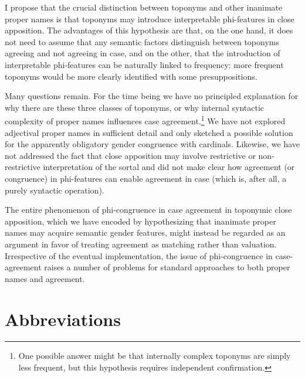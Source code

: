 \documentclass[output=paper,colorlinks,citecolor=brown]{langscibook}
\begin{document}
I propose that the crucial distinction between toponyms and other inanimate proper names is that toponyms may introduce interpretable phi-features in close apposition. The advantages of this hypothesis are that, on the one hand, it does not need to assume that any semantic factors distinguish between toponyms agreeing and not agreeing in case, and on the other, that the introduction of interpretable phi-features can be naturally linked to frequency: more frequent toponyms would be more clearly identified with some presuppositions.

Many questions remain. For the time being we have no principled explanation for why there are these three classes of toponyms, or why internal syntactic complexity of proper names influences case agreement.\footnote{One possible answer might be that internally complex toponyms are simply less frequent, but this hypothesis requires independent confirmation.} We have not explored adjectival proper names in sufficient detail and only sketched a possible solution for the apparently obligatory gender congruence with cardinals. Likewise, we have not addressed the fact that close apposition may involve restrictive or non-restrictive interpretation of the sortal and did not make clear how agreement (or congruence) in phi-features can enable agreement in case (which is, after all, a purely syntactic operation).

The entire phenomenon of phi-congruence in case agreement in toponymic close apposition, which we have encoded by hypothesizing that inanimate proper names may acquire semantic gender features, might instead be regarded as an argument in favor of treating agreement as matching rather than valuation. Irrespective of the eventual implementation, the issue of phi-congruence in case-agreement raises a number of problems for standard approaches to both proper names and agreement.


\section*{Abbreviations}
\end{document}
